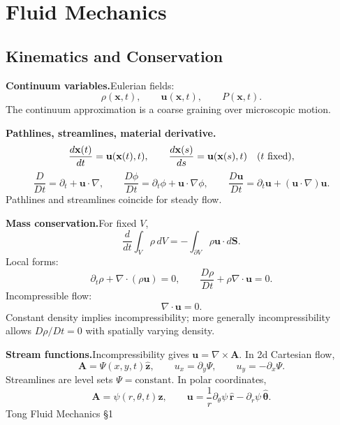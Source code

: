 \providecommand{\half}{\frac{1}{2}}
\providecommand{\pd}{\partial}
\providecommand{\src}[1]{\hfill{\footnotesize #1}}
\providecommand{\uvec}{\mathbf{u}}
\providecommand{\Uvec}{\mathbf{U}}
\providecommand{\xvec}{\mathbf{x}}
\providecommand{\rvec}{\mathbf{r}}
\providecommand{\fvec}{\mathbf{f}}
\providecommand{\Fvec}{\mathbf{F}}
\providecommand{\omvec}{\boldsymbol{\omega}}
\providecommand{\zhat}{\hat{\mathbf z}}
\providecommand{\xhat}{\hat{\mathbf x}}
\providecommand{\yhat}{\hat{\mathbf y}}
\providecommand{\rhatc}{\hat{\mathbf r}}
\providecommand{\thatc}{\hat{\boldsymbol{\theta}}}
\providecommand{\khat}{\hat{\mathbf k}}

\section{Fluid Mechanics}
\label{sec:fluid-mechanics}

\subsection{Kinematics and Conservation}

\noindent\textbf{Continuum variables.}\quad Eulerian fields:
\[
  \rho(\xvec,t),\qquad \uvec(\xvec,t),\qquad P(\xvec,t).
\]
The continuum approximation is a coarse graining over microscopic motion.

\noindent\textbf{Pathlines, streamlines, material derivative.}\quad
\[
  \frac{d\xvec(t)}{dt}=\uvec(\xvec(t),t),
  \qquad
  \frac{d\xvec(s)}{ds}=\uvec(\xvec(s),t)\quad(t\ {\rm fixed}),
\]
\[
  \boxed{\frac{D}{Dt}=\pd_t+\uvec\cdot\nabla},
  \qquad
  \frac{D\phi}{Dt}=\pd_t\phi+\uvec\cdot\nabla\phi,
  \qquad
  \frac{D\uvec}{Dt}=\pd_t\uvec+(\uvec\cdot\nabla)\uvec.
\]
Pathlines and streamlines coincide for steady flow.

\noindent\textbf{Mass conservation.}\quad For fixed $V$,
\[
  \frac{d}{dt}\int_V\rho\,dV=-\int_{\pd V}\rho\uvec\cdot d\mathbf S.
\]
Local forms:
\[
  \boxed{\pd_t\rho+\nabla\cdot(\rho\uvec)=0},
  \qquad
  \boxed{\frac{D\rho}{Dt}+\rho\nabla\cdot\uvec=0}.
\]
Incompressible flow:
\[
  \boxed{\nabla\cdot\uvec=0}.
\]
Constant density implies incompressibility; more generally incompressibility allows $D\rho/Dt=0$ with spatially varying density.

\noindent\textbf{Stream functions.}\quad Incompressibility gives $\uvec=\nabla\times\mathbf A$. In 2d Cartesian flow,
\[
  \mathbf A=\Psi(x,y,t)\zhat,\qquad
  \boxed{u_x=\pd_y\Psi,\qquad u_y=-\pd_x\Psi}.
\]
Streamlines are level sets $\Psi=\text{constant}$. In polar coordinates,
\[
  \mathbf A=\psi(r,\theta,t)\zhat,\qquad
  \boxed{\uvec=\frac1r\pd_\theta\psi\,\rhatc-\pd_r\psi\,\thatc}.
\]
\src{Tong Fluid Mechanics \S 1}

